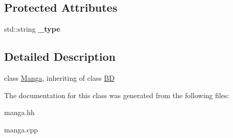 \subsection*{Protected Attributes}
\begin{DoxyCompactItemize}
\item 
\hypertarget{classManga_aeefe87e43f208fcf10cb0f497f0df549}{
std::string {\bfseries \_\-type}}
\label{classManga_aeefe87e43f208fcf10cb0f497f0df549}

\end{DoxyCompactItemize}


\subsection{Detailed Description}
class \hyperlink{classManga}{Manga}, inheriting of class \hyperlink{classBD}{BD} 

The documentation for this class was generated from the following files:\begin{DoxyCompactItemize}
\item 
manga.hh\item 
manga.cpp\end{DoxyCompactItemize}
